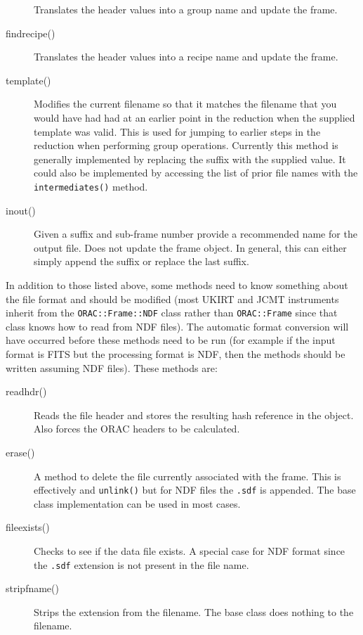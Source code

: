 \documentclass[twoside,11pt]{article}
\renewcommand{\_}{\texttt{\symbol{95}}}
\begin{document}
\begin{description}
Translates the header values into a group name and update the frame.

\item[findrecipe()] \mbox{}

Translates the header values into a recipe name and update the frame.

\item[template()] \mbox{}

Modifies the current filename so that it matches the filename that you 
would have had had at an earlier point in the reduction when the
supplied template was valid. This is used for jumping to earlier steps
in the reduction when performing group operations.
Currently this method is generally
implemented by replacing the suffix with the supplied value. It could
also be implemented by accessing the list of prior file names with the
\texttt{intermediates()} method.

\item[inout()] \mbox{}

Given a suffix and sub-frame number provide a recommended name for the 
output file. Does not update the frame object. In general, this can
either simply append the suffix or replace the last suffix.

\end{description}

In addition to those listed above, some methods need to know something
about the file format and should be modified (most UKIRT and JCMT
instruments inherit from the \texttt{ORAC::Frame::NDF} class rather
than \texttt{ORAC::Frame} since that class knows how to read from NDF
files). The automatic format conversion will have occurred before
these methods need to be run (for example if the input format is FITS
but the processing format is NDF, then the methods should be written
assuming NDF files). These methods are:

\begin{description}

\item[readhdr()] \mbox{}

Reads the file header and stores the resulting hash reference in the
object. Also forces the ORAC headers to be calculated.

\item[erase()] \mbox{}

A method to delete the file currently associated with the frame. This
is effectively and \texttt{unlink()} but for NDF files the
\texttt{.sdf} is appended. The base class implementation can be used
in most cases.

\item[file\_exists()] \mbox{}

Checks to see if the data file exists. A special case for NDF format
since the \texttt{.sdf} extension is not present in the file name.

\item[stripfname()] \mbox{}

Strips the extension from the filename. The base class does nothing to 
the filename.

\end{description}
\end{document}
